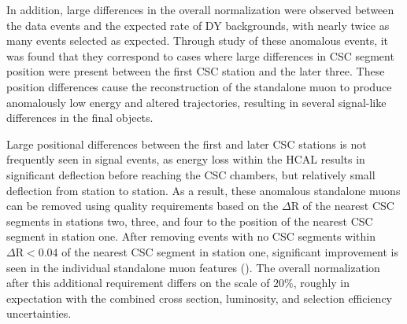 In addition, large differences in the overall normalization were observed between the data events and the expected rate of DY backgrounds, with nearly twice as many events selected as expected.
Through study of these anomalous events, it was found that they correspond to cases where large differences in CSC segment position were present between the first CSC station and the later three.
These position differences cause the reconstruction of the standalone muon to produce anomalously low energy and altered trajectories, resulting in several signal-like differences in the final objects. 

Large positional differences between the first and later CSC stations is not frequently seen in signal events, as energy loss within the HCAL results in significant deflection before reaching the CSC chambers, but relatively small deflection from station to station. 
As a result, these anomalous standalone muons can be removed using quality requirements based on the $\Delta$R of the nearest CSC segments in stations two, three, and four to the position of the nearest CSC segment in station one.
After removing events with no CSC segments within $\Delta\mathrm{R}<0.04$ of the nearest CSC segment in station one, significant improvement is seen in the individual standalone muon features ().
The overall normalization after this additional requirement differs on the scale of $20\%$, roughly in expectation with the combined cross section, luminosity, and selection efficiency uncertainties.

